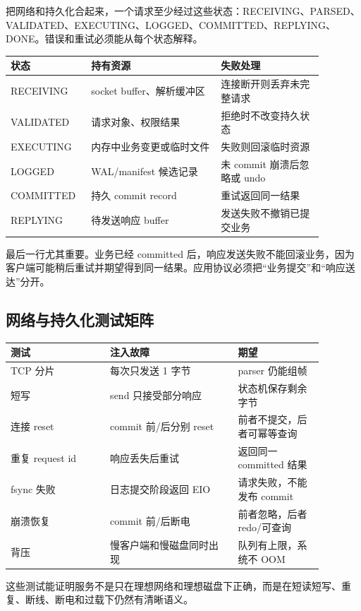 把网络和持久化合起来，一个请求至少经过这些状态：RECEIVING、PARSED、VALIDATED、EXECUTING、LOGGED、COMMITTED、REPLYING、DONE。错误和重试必须能从每个状态解释。

\begin{longtable}{|p{0.2\linewidth}|p{0.38\linewidth}|p{0.3\linewidth}|}
\toprule
状态 & 持有资源 & 失败处理 \\
\midrule
RECEIVING & socket buffer、解析缓冲区 & 连接断开则丢弃未完整请求 \\\tablerowrule
VALIDATED & 请求对象、权限结果 & 拒绝时不改变持久状态 \\\tablerowrule
EXECUTING & 内存中业务变更或临时文件 & 失败则回滚临时资源 \\\tablerowrule
LOGGED & WAL/manifest 候选记录 & 未 commit 崩溃后忽略或 undo \\\tablerowrule
COMMITTED & 持久 commit record & 重试返回同一结果 \\\tablerowrule
REPLYING & 待发送响应 buffer & 发送失败不撤销已提交业务 \\
\bottomrule
\end{longtable}

最后一行尤其重要。业务已经 committed 后，响应发送失败不能回滚业务，因为客户端可能稍后重试并期望得到同一结果。应用协议必须把“业务提交”和“响应送达”分开。

\subsection{网络与持久化测试矩阵}

\begin{longtable}{|p{0.28\linewidth}|p{0.36\linewidth}|p{0.24\linewidth}|}
\toprule
测试 & 注入故障 & 期望 \\
\midrule
TCP 分片 & 每次只发送 1 字节 & parser 仍能组帧 \\\tablerowrule
短写 & send 只接受部分响应 & 状态机保存剩余字节 \\\tablerowrule
连接 reset & commit 前/后分别 reset & 前者不提交，后者可幂等查询 \\\tablerowrule
重复 request id & 响应丢失后重试 & 返回同一 committed 结果 \\\tablerowrule
fsync 失败 & 日志提交阶段返回 EIO & 请求失败，不能发布 commit \\\tablerowrule
崩溃恢复 & commit 前/后断电 & 前者忽略，后者 redo/可查询 \\\tablerowrule
背压 & 慢客户端和慢磁盘同时出现 & 队列有上限，系统不 OOM \\
\bottomrule
\end{longtable}

这些测试能证明服务不是只在理想网络和理想磁盘下正确，而是在短读短写、重复、断线、断电和过载下仍然有清晰语义。
